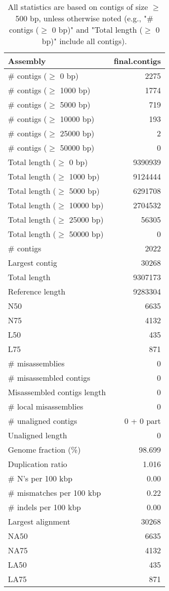 \documentclass[12pt,a4paper]{article}
\begin{document}
\begin{table}[ht]
\begin{center}
\caption{All statistics are based on contigs of size $\geq$ 500 bp, unless otherwise noted (e.g., "\# contigs ($\geq$ 0 bp)" and "Total length ($\geq$ 0 bp)" include all contigs).}
\begin{tabular}{|l*{1}{|r}|}
\hline
Assembly & final.contigs \\ \hline
\# contigs ($\geq$ 0 bp) & 2275 \\ \hline
\# contigs ($\geq$ 1000 bp) & 1774 \\ \hline
\# contigs ($\geq$ 5000 bp) & 719 \\ \hline
\# contigs ($\geq$ 10000 bp) & 193 \\ \hline
\# contigs ($\geq$ 25000 bp) & 2 \\ \hline
\# contigs ($\geq$ 50000 bp) & 0 \\ \hline
Total length ($\geq$ 0 bp) & 9390939 \\ \hline
Total length ($\geq$ 1000 bp) & 9124444 \\ \hline
Total length ($\geq$ 5000 bp) & 6291708 \\ \hline
Total length ($\geq$ 10000 bp) & 2704532 \\ \hline
Total length ($\geq$ 25000 bp) & 56305 \\ \hline
Total length ($\geq$ 50000 bp) & 0 \\ \hline
\# contigs & 2022 \\ \hline
Largest contig & 30268 \\ \hline
Total length & 9307173 \\ \hline
Reference length & 9283304 \\ \hline
N50 & 6635 \\ \hline
N75 & 4132 \\ \hline
L50 & 435 \\ \hline
L75 & 871 \\ \hline
\# misassemblies & 0 \\ \hline
\# misassembled contigs & 0 \\ \hline
Misassembled contigs length & 0 \\ \hline
\# local misassemblies & 0 \\ \hline
\# unaligned contigs & 0 + 0 part \\ \hline
Unaligned length & 0 \\ \hline
Genome fraction (\%) & 98.699 \\ \hline
Duplication ratio & 1.016 \\ \hline
\# N's per 100 kbp & 0.00 \\ \hline
\# mismatches per 100 kbp & 0.22 \\ \hline
\# indels per 100 kbp & 0.00 \\ \hline
Largest alignment & 30268 \\ \hline
NA50 & 6635 \\ \hline
NA75 & 4132 \\ \hline
LA50 & 435 \\ \hline
LA75 & 871 \\ \hline
\end{tabular}
\end{center}
\end{table}
\end{document}
